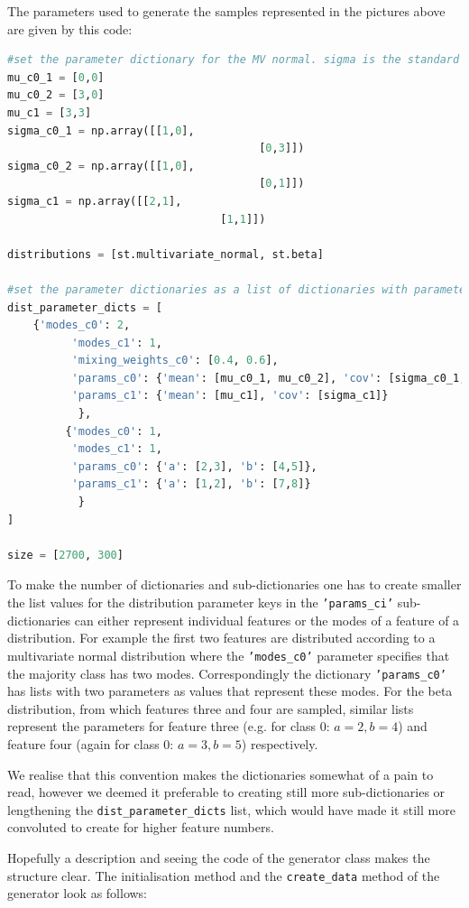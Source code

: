 The parameters used to generate the samples represented in the pictures above are given by this code:
\begin{lstlisting}[language=Python, numbers=none]
#set the parameter dictionary for the MV normal. sigma is the standard deviation
mu_c0_1 = [0,0]
mu_c0_2 = [3,0]
mu_c1 = [3,3]
sigma_c0_1 = np.array([[1,0],
                                       [0,3]])
sigma_c0_2 = np.array([[1,0],
                                       [0,1]])
sigma_c1 = np.array([[2,1],
                         		 [1,1]])
    
distributions = [st.multivariate_normal, st.beta]

#set the parameter dictionaries as a list of dictionaries with parameter dictionaries for classes individually.
dist_parameter_dicts = [
	{'modes_c0': 2,
          'modes_c1': 1,
          'mixing_weights_c0': [0.4, 0.6],
          'params_c0': {'mean': [mu_c0_1, mu_c0_2], 'cov': [sigma_c0_1, sigma_c0_2]},
          'params_c1': {'mean': [mu_c1], 'cov': [sigma_c1]}
           },
         {'modes_c0': 1,
          'modes_c1': 1,
          'params_c0': {'a': [2,3], 'b': [4,5]},
          'params_c1': {'a': [1,2], 'b': [7,8]}
           }
]

size = [2700, 300]
\end{lstlisting}

To make the number of dictionaries and sub-dictionaries one has to create smaller the list values for the distribution parameter keys 
in the \texttt{'params\_ci'} sub-dictionaries can either represent individual features or the modes of a feature of a distribution.
For example the first two features are distributed according to a multivariate normal distribution where the \texttt{'modes\_c0'} parameter specifies that the
majority class has two modes. Correspondingly the dictionary \texttt{'params\_c0'} has lists with two parameters as values that represent these modes.
For the beta distribution, from which features three and four are sampled, similar lists represent the parameters for feature three (e.g. for class 0: $a = 2, b=4$)
and feature four (again for class 0: $a = 3, b=5$) respectively.

We realise that this convention makes the dictionaries somewhat of a pain to read, however we deemed it preferable to creating still more sub-dictionaries or lengthening
the \texttt{dist\_parameter\_dicts} list, which would have made it still more convoluted to create for higher feature numbers.

Hopefully a description and seeing the code of the generator class makes the structure clear.
The initialisation method and the \texttt{create\_data} method of the generator look as follows:

